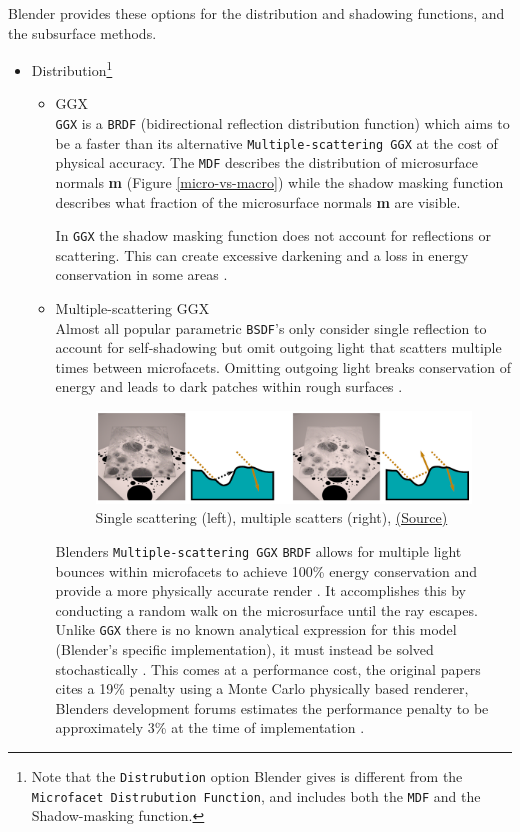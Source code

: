 \documentclass[11pt]{article}
\begin{document}
Blender provides these options for the distribution and shadowing functions, and
the subsurface methods.
\begin{itemize}
\item Distribution\footnote{Note that the \texttt{Distrubution} option Blender gives is different from the
\texttt{Microfacet Distrubution Function}, and includes both the \texttt{MDF} and the
Shadow-masking function.}
\begin{itemize}
\item GGX \\
\texttt{GGX} is a \texttt{BRDF} (bidirectional reflection distribution function) which
aims to be a faster than its alternative \texttt{Multiple-scattering GGX} at the
cost  of physical accuracy.
The \texttt{MDF} describes the distribution of microsurface normals \textbf{m} (Figure
\ref{micro-vs-macro}) while the shadow masking function describes what fraction of
the microsurface normals \textbf{m} are visible. \cite{ggx-paper}

In \texttt{GGX} the shadow masking function does not account for reflections or
scattering. This can create excessive darkening and a loss in energy
conservation in some areas \cite{principled-bsdf-docs}.

\item Multiple-scattering GGX \\
Almost all popular parametric \texttt{BSDF}'s only consider single reflection
to account for self-shadowing but omit outgoing light that scatters
multiple times between microfacets. Omitting outgoing light  breaks
conservation of energy and leads to dark patches within rough surfaces
\cite{ms-ggx-paper}.
\begin{figure}[htbp]
\centering
\includegraphics[width=.9\linewidth]{Images/multiplescatteringsmith_teaser.png}
\caption{Single scattering (left), multiple scatters (right), \href{https://eheitzresearch.files.wordpress.com/2015/10/multiplescatteringsmith\_teaser.png}{(Source)}}
\end{figure}

Blenders \texttt{Multiple-scattering GGX} \texttt{BRDF} allows for multiple light bounces
within microfacets to achieve 100\% energy conservation and provide a more
physically accurate render \cite{principled-bsdf-docs,ms-ggx-paper} . It
accomplishes this by conducting a random walk on the microsurface until the
ray escapes. Unlike \texttt{GGX} there is no known analytical expression for this
model (Blender's specific implementation), it must instead be solved
stochastically \cite{blender-issue-tracker}.
This comes at a performance cost, the original papers cites a 19\% penalty
using a Monte Carlo physically based renderer, Blenders development forums
estimates the performance penalty to be approximately 3\% at the time of
implementation \cite{blender-issue-tracker}.
\end{itemize}


\end{itemize}
\end{document}
